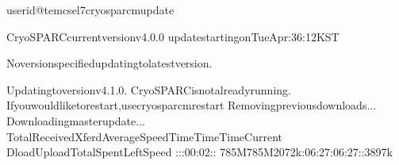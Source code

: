 \documentclass[a4paper,11pt,english]{sphinxmanual}
\begin{document}
\begin{sphinxVerbatim}[commandchars=\\\{\}]
userid@tem\PYGZhy{}cs\PYGZhy{}el7\PYGZdl{}\PYGZgt{}cryosparcmupdate

CryoSPARCcurrentversionv4.0.0
updatestartingonTueApr:36:12KST

Noversionspecified\PYGZhy{}updatingtolatestversion.

Updatingtoversionv4.1.0.
CryoSPARCisnotalreadyrunning.
Ifyouwouldliketorestart,usecryosparcmrestart
Removingpreviousdownloads...
Downloadingmasterupdate...
\PYGZpc{}Total\PYGZpc{}Received\PYGZpc{}XferdAverageSpeedTimeTimeTimeCurrent
DloadUploadTotalSpentLeftSpeed
\PYGZhy{}\PYGZhy{}:\PYGZhy{}\PYGZhy{}:\PYGZhy{}\PYGZhy{}:00:02\PYGZhy{}\PYGZhy{}:\PYGZhy{}\PYGZhy{}:\PYGZhy{}\PYGZhy{}
785M785M2072k:06:27:06:27\PYGZhy{}\PYGZhy{}:\PYGZhy{}\PYGZhy{}:\PYGZhy{}\PYGZhy{}3897k

\end{sphinxVerbatim}
\end{document}
